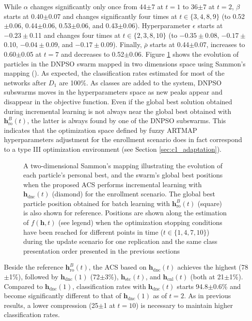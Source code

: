 While $\alpha$ changes significantly only once from 44$\pm$7 at $t=1$ to 36$\pm$7 at $t=2$, $\beta$ starts at 0.40$\pm$0.07 and changes significantly four times at $t\in\{3,4,8,9\}$ (to 0.52$\pm$0.06, 0.44$\pm$0.06, 0.53$\pm$0.06, and 0.43$\pm$0.06). Hyperparameter $\epsilon$ starts at $-0.23\pm$0.11 and changes four times at $t\in\{2,3,8,10\}$ (to $-0.35\pm$0.08, $-0.17\pm$0.10, $-0.04\pm$0.09, and $-0.17\pm$0.09). Finally, $\bar{\rho}$  starts at 0.44$\pm$0.07, increases to 0.60$\pm$0.05 at $t=7$ and decreases to 0.52$\pm$0.06. Figure \ref{fig:c1_AddDynSwarm} shows the evolution of particles in the DNPSO swarm mapped in two dimensions space using Sammon's mapping (\cite{kim09}). As expected, the classification rates estimated for most of the networks after $D_1$ are 100\%. As classes are added to the system, DNPSO subswarms moves in the hyperparameters space as new peaks appear and disappear in the objective function. Even if the global best solution obtained during incremental learning is not always near the global best obtained with $\textbf{h}_\text{ro}^B(t)$, the latter is always found by one of the DNPSO subswarms. This indicates that the optimization space defined by fuzzy ARTMAP hyperparameters adjustment for the enrollment scenario does in fact correspond to a type III optimization environment (see Section \ref{sec:c1_adaptation}).

\begin{figure}[t]
  \centering
	\caption{A two-dimensional Sammon's mapping illustrating the evolution of each particle's personal best, and the swarm's global best positions when the proposed ACS performs incremental learning with $\textbf{h}_\text{dnc}(t)$ (diamond) for the enrollment scenario. The global best particle position obtained for batch learning with $\textbf{h}_\text{ro}^B(t)$ (square) is also shown for reference. Positions are shown along the estimation of $f(\textbf{h},t)$ (see legend) when the optimization stopping conditions have been reached for different points in time ($t\in\{1,4,7,10\}$) during the update scenario for one replication and the same class presentation order presented in the previous sections}
	\label{fig:c1_AddDynSwarm}
\end{figure}

Beside the reference $\textbf{h}_\text{ro}^B(t)$, the ACS based on $\textbf{h}_\text{dnc}(t)$ achieves the highest (78$\pm$1\%), followed by $\textbf{h}_\text{dnc}(1)$ (72$\pm$3\%), $\textbf{h}_\text{stc}(t)$, and $\textbf{h}_\text{cnl}(t)$ (both at 21$\pm$1\%). Compared to $\textbf{h}_\text{dnc}(1)$, classification rates with $\textbf{h}_\text{dnc}(t)$ starts 94.8$\pm$0.6\% and become significantly different to that of $\textbf{h}_\text{dnc}(1)$ as of $t=2$. As in previous results, a lower compression (25$\pm$1 at $t=10$) is necessary to maintain higher classification rates.

